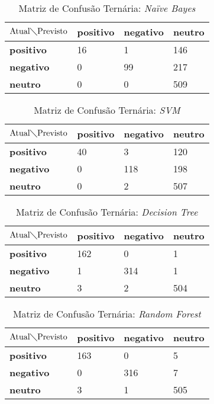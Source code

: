 \begin{table}[h!]
\centering
\caption{Matriz de Confusão Ternária: \textit{Naïve Bayes}}
\label{tab:mct-nb}
\begin{tabular}{|l|l|l|l|}
\hline
$\textrm{Atual}\diagdown\textrm{Previsto}$ & \textbf{positivo} & \textbf{negativo} & \textbf{neutro}\\ \hline
\textbf{positivo} & 16 & 1 & 146\\ \hline
\textbf{negativo} & 0 & 99 & 217\\ \hline
\textbf{neutro} & 0 & 0 & 509 \\ \hline
\end{tabular}
\end{table}

\begin{table}[h!]
\centering
\caption{Matriz de Confusão Ternária: \textit{SVM}}
\label{tab:mct-svm}
\begin{tabular}{|l|l|l|l|}
\hline
$\textrm{Atual}\diagdown\textrm{Previsto}$ & \textbf{positivo} & \textbf{negativo} & \textbf{neutro}\\ \hline
\textbf{positivo} & 40 & 3 & 120\\ \hline
\textbf{negativo} & 0 & 118 & 198\\ \hline
\textbf{neutro} & 0 & 2 & 507 \\ \hline
\end{tabular}
\end{table}

\begin{table}[h!]
\centering
\caption{Matriz de Confusão Ternária: \textit{Decision Tree}}
\label{tab:mct-dt}
\begin{tabular}{|l|l|l|l|}
\hline
$\textrm{Atual}\diagdown\textrm{Previsto}$ & \textbf{positivo} & \textbf{negativo} & \textbf{neutro}\\ \hline
\textbf{positivo} & 162 & 0 & 1\\ \hline
\textbf{negativo} & 1 & 314 & 1\\ \hline
\textbf{neutro} & 3 & 2 & 504 \\ \hline
\end{tabular}
\end{table}

\begin{table}[h!]
\centering
\caption{Matriz de Confusão Ternária: \textit{Random Forest}}
\label{tab:mct-rf}
\begin{tabular}{|l|l|l|l|}
\hline
$\textrm{Atual}\diagdown\textrm{Previsto}$ & \textbf{positivo} & \textbf{negativo} & \textbf{neutro}\\ \hline
\textbf{positivo} & 163 & 0 & 5\\ \hline
\textbf{negativo} & 0 & 316 & 7\\ \hline
\textbf{neutro} & 3 & 1 & 505 \\ \hline
\end{tabular}
\end{table}

